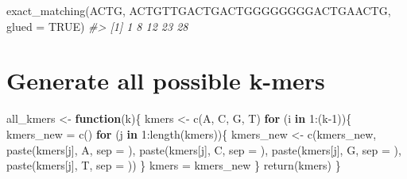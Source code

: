 \documentclass[
]{book}
\newenvironment{Shaded}{\begin{snugshade}}{\end{snugshade}}
\newcommand{\AttributeTok}[1]{\textcolor[rgb]{0.77,0.63,0.00}{#1}}
\newcommand{\CommentTok}[1]{\textcolor[rgb]{0.56,0.35,0.01}{\textit{#1}}}
\newcommand{\ConstantTok}[1]{\textcolor[rgb]{0.00,0.00,0.00}{#1}}
\newcommand{\ControlFlowTok}[1]{\textcolor[rgb]{0.13,0.29,0.53}{\textbf{#1}}}
\newcommand{\DecValTok}[1]{\textcolor[rgb]{0.00,0.00,0.81}{#1}}
\newcommand{\FunctionTok}[1]{\textcolor[rgb]{0.00,0.00,0.00}{#1}}
\newcommand{\NormalTok}[1]{#1}
\newcommand{\OtherTok}[1]{\textcolor[rgb]{0.56,0.35,0.01}{#1}}
\newcommand{\SpecialCharTok}[1]{\textcolor[rgb]{0.00,0.00,0.00}{#1}}
\newcommand{\StringTok}[1]{\textcolor[rgb]{0.31,0.60,0.02}{#1}}
\begin{document}
\begin{Shaded}
\begin{Highlighting}[]
\FunctionTok{exact\_matching}\NormalTok{(}\StringTok{\textquotesingle{}ACTG\textquotesingle{}}\NormalTok{, }\StringTok{\textquotesingle{}ACTGTTGACTGACTGGGGGGGGACTGAACTG\textquotesingle{}}\NormalTok{, }\AttributeTok{glued =} \ConstantTok{TRUE}\NormalTok{)}
\CommentTok{\#\textgreater{} [1]  1  8 12 23 28}
\end{Highlighting}
\end{Shaded}

\hypertarget{generate-all-possible-k-mers}{%
\section{Generate all possible k-mers}\label{generate-all-possible-k-mers}}

\begin{Shaded}
\begin{Highlighting}[]
\NormalTok{all\_kmers }\OtherTok{\textless{}{-}} \ControlFlowTok{function}\NormalTok{(k)\{}
\NormalTok{  kmers }\OtherTok{\textless{}{-}} \FunctionTok{c}\NormalTok{(}\StringTok{\textquotesingle{}A\textquotesingle{}}\NormalTok{, }\StringTok{\textquotesingle{}C\textquotesingle{}}\NormalTok{, }\StringTok{\textquotesingle{}G\textquotesingle{}}\NormalTok{, }\StringTok{\textquotesingle{}T\textquotesingle{}}\NormalTok{)}
  \ControlFlowTok{for}\NormalTok{ (i }\ControlFlowTok{in} \DecValTok{1}\SpecialCharTok{:}\NormalTok{(k}\DecValTok{{-}1}\NormalTok{))\{}
\NormalTok{    kmers\_new }\OtherTok{=} \FunctionTok{c}\NormalTok{()}
    \ControlFlowTok{for}\NormalTok{ (j }\ControlFlowTok{in} \DecValTok{1}\SpecialCharTok{:}\FunctionTok{length}\NormalTok{(kmers))\{}
\NormalTok{      kmers\_new }\OtherTok{\textless{}{-}} \FunctionTok{c}\NormalTok{(kmers\_new,}
                     \FunctionTok{paste}\NormalTok{(kmers[j], }\StringTok{\textquotesingle{}A\textquotesingle{}}\NormalTok{, }\AttributeTok{sep =} \StringTok{\textquotesingle{}\textquotesingle{}}\NormalTok{),}
                     \FunctionTok{paste}\NormalTok{(kmers[j], }\StringTok{\textquotesingle{}C\textquotesingle{}}\NormalTok{, }\AttributeTok{sep =} \StringTok{\textquotesingle{}\textquotesingle{}}\NormalTok{),}
                     \FunctionTok{paste}\NormalTok{(kmers[j], }\StringTok{\textquotesingle{}G\textquotesingle{}}\NormalTok{, }\AttributeTok{sep =} \StringTok{\textquotesingle{}\textquotesingle{}}\NormalTok{),}
                     \FunctionTok{paste}\NormalTok{(kmers[j], }\StringTok{\textquotesingle{}T\textquotesingle{}}\NormalTok{, }\AttributeTok{sep =} \StringTok{\textquotesingle{}\textquotesingle{}}\NormalTok{))}
\NormalTok{    \}}
\NormalTok{    kmers }\OtherTok{=}\NormalTok{ kmers\_new}
\NormalTok{  \}}
  \FunctionTok{return}\NormalTok{(kmers)}
\NormalTok{\}}
\end{Highlighting}
\end{Shaded}
\end{document}

